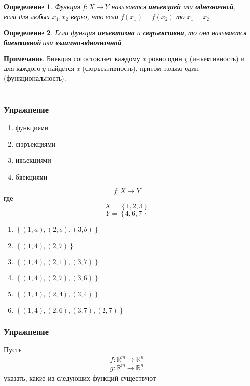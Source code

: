\documentclass[]{article}
\newtheorem{definition}{Определение}
\begin{document}
	\begin{definition}
		Функция $f:X\rightarrow Y$ называется \textbf{инъекцией} или \textbf{однозначной}, если для любых $x_1, x_2$ верно, что если $f(x_1)=f(x_2)$ то $x_1=x_2$
	\end{definition}

	\begin{definition}
		Если функция \textbf{инъективна} и \textbf{сюръективна}, то она называется \textbf{биективной} или \textbf{взаимно-однозначной}
	\end{definition}
	
	\textbf{Примечание}. Биекция сопостовляет каждому $x$ ровно один $y$ (инъективность) и для каждого $y$ найдется $x$ (сюръективность), притом только один (функциональность).
	\\
	\\
	\subsubsection{Упражнение}
	\begin{enumerate}
		\item функциями
		\item сюръекциями
		\item инъекциями
		\item биекциями
	\end{enumerate} $$f:X\rightarrow Y$$ где $$X=\left\{1,2,3\right\}$$  $$Y=\left\{4,6,7\right\}$$
	
	\begin{enumerate}
		\item $\left\{(1,a),(2,a),(3,b)\right\}$ 
		\item $\left\{(1,4),(2,7)\right\}$ 
		\item $\left\{(1,4),(2,1),(3,7)\right\}$ 
		\item $\left\{(1,4),(2,7),(3,6)\right\}$
		\item $\left\{(1,4),(2,4),(3,4)\right\}$  
		\item $\left\{(1,4),(2,6),(3,7),(2,7)\right\}$  
	\end{enumerate}
	
	\subsubsection{Упражнение}
	Пусть \begin{gather*}
		f:\mathbb{R}^m\rightarrow\mathbb{R}^n
		\\
		g:\mathbb{R}^m\rightarrow\mathbb{R}^n
	\end{gather*}
	указать, какие из следующих функций существуют
	
\end{document}
